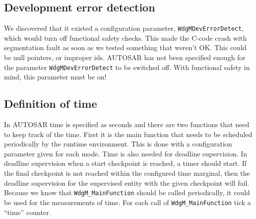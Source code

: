 \subsection{Development error detection}
We discovered that it existed a configuration parameter,
\lstinline!WdgMDevErrorDetect!, which would turn off functional safety
checks. This made the C-code crash with segmentation fault as soon as we tested
something that weren't OK. This could be null pointers, or improper ids. AUTOSAR
has not been specified enough for the parameter \lstinline!WdgMDevErrorDetect!
to be switched off. With functional safety in mind, this parameter must be on!

\subsection{Definition of time}
\label{SEC:FUNCTIONAL_SAFETY_TIME}
In AUTOSAR time is specified as seconds and there are two functions that need to
keep track of the time. First it is the main function that needs to be scheduled
periodically by the runtime environment. This is done with a configuration
parameter given for each mode. Time is also needed for deadline supervision. In
deadline supervision when a start checkpoint is reached, a timer should
start. If the final checkpoint is not reached within the configured time
marginal, then the deadline supervision for the supervised entity with the given
checkpoint will fail. Because we know that \lstinline!WdgM_MainFunction! should
be called periodically, it could be used for the measurements of time. For each
call of \lstinline!WdgM_MainFunction! tick a ``time'' counter.



